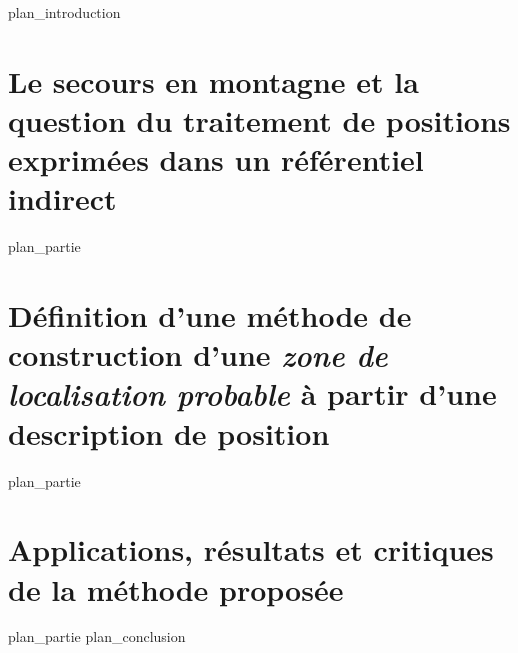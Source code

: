 \label{part:int}
{plan_introduction}
\part{Le secours en montagne et la question du traitement de positions exprimées dans un référentiel indirect}
\label{part:01}
{plan_partie}
\part{Définition d'une méthode de construction d'une \emph{zone de
    localisation probable} à partir d'une description de position}
\label{part:02}
{plan_partie}
\part{Applications, résultats et critiques de la méthode proposée}
\label{part:03}
{plan_partie}
\label{part:cnl}
{plan_conclusion}

